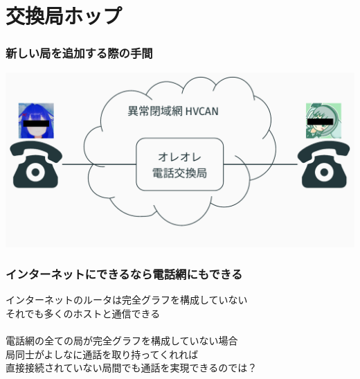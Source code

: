 \documentclass[
  lualatex,
  aspectratio=169,
  14pt
]{beamer}
\begin{document}
\section{交換局ホップ}

\begin{frame}
  \frametitle{新しい局を追加する際の手間}

  \includegraphics[page=6,width=\linewidth]{./images/pictures.pdf}
\end{frame}

\begin{frame}
  \frametitle{インターネットにできるなら電話網にもできる}

  インターネットのルータは完全グラフを構成していない\\
  \hspace{1.5\zw}それでも多くのホストと通信できる
  \\~\\[-.5\baselineskip]

  電話網の全ての局が完全グラフを構成していない場合\\
  \hspace{1.5\zw}局同士がよしなに通話を取り持ってくれれば\\
  \hspace{1.5\zw}直接接続されていない局間でも通話を実現できるのでは？
\end{frame}
\end{document}
